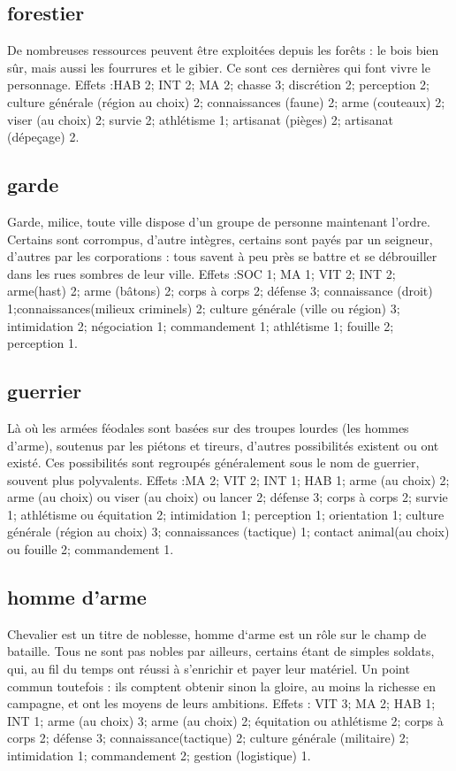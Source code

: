 \documentclass[10pt,a4paper,twocolumn]{book}
\begin{document}
\subsection*{forestier}
De nombreuses ressources peuvent être exploitées depuis les forêts : le bois bien sûr, mais aussi les fourrures et le gibier. Ce sont ces dernières qui font vivre le personnage.
Effets :HAB 2; INT 2; MA 2; chasse 3; discrétion 2; perception 2; culture générale (région au choix) 2; connaissances (faune) 2; arme (couteaux) 2; viser (au choix) 2; survie 2; athlétisme 1; artisanat (pièges) 2; artisanat (dépeçage) 2.
\subsection*{garde}
Garde, milice, toute ville dispose d’un groupe de personne maintenant l’ordre. Certains sont corrompus, d’autre intègres, certains sont payés par un seigneur, d’autres par les corporations : tous savent à peu près se battre et se débrouiller dans les rues sombres de leur ville.
Effets :SOC 1; MA 1; VIT 2; INT 2; arme(hast) 2; arme (bâtons) 2; corps à corps 2; défense 3; connaissance (droit) 1;connaissances(milieux criminels) 2; culture générale (ville ou région) 3; intimidation 2; négociation 1; commandement 1; athlétisme 1; fouille 2; perception 1.
\subsection*{guerrier}
Là où les armées féodales sont basées sur des troupes lourdes (les hommes d’arme), soutenus par les piétons et tireurs, d’autres possibilités existent ou ont existé. Ces possibilités sont regroupés généralement sous le nom de guerrier, souvent plus polyvalents.
Effets :MA 2; VIT 2; INT 1; HAB 1; arme (au choix) 2; arme (au choix) ou viser (au choix) ou lancer 2; défense 3; corps à corps 2; survie 1; athlétisme ou équitation 2; intimidation 1; perception 1; orientation 1; culture générale (région au choix) 3; connaissances (tactique) 1; contact animal(au choix) ou fouille 2; commandement 1. 
\subsection*{homme d’arme}
Chevalier est un titre de noblesse, homme d‘arme est un rôle sur le champ de bataille. Tous ne sont pas nobles par ailleurs, certains étant de simples soldats, qui, au fil du temps ont réussi à s’enrichir et payer leur matériel. Un point commun toutefois : ils comptent obtenir sinon la gloire, au moins la richesse en campagne, et ont les moyens de leurs ambitions.
Effets : VIT 3; MA 2; HAB 1; INT 1; arme (au choix) 3; arme (au choix) 2; équitation ou athlétisme 2; corps à corps 2; défense 3; connaissance(tactique) 2; culture générale (militaire) 2; intimidation 1; commandement 2; gestion (logistique) 1.
\end{document}
